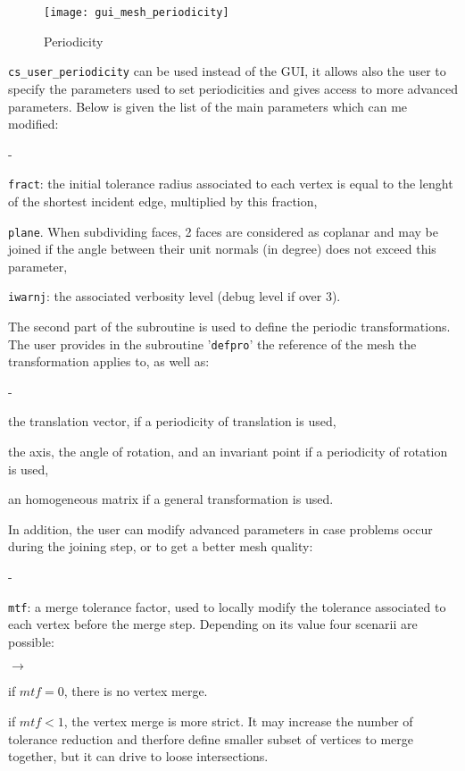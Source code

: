 {{{\begin{figure}[!h]
\begin{center}
\texttt{[image: gui\_mesh\_periodicity]}
\caption{Periodicity}
\label{fig:periodicities}
\end{center}
\end{figure}

\texttt{cs\_user\_periodicity} can be used instead of the GUI, it allows also the user to specify the parameters used to set periodicities and gives access to more advanced parameters. Below is given the list of the main parameters which can me modified:
\begin{list}{-}{}
\item \texttt{fract}: the initial tolerance radius associated to each vertex is equal to the lenght of the shortest incident edge, multiplied by this fraction,
\item \texttt{plane}. When subdividing faces, 2 faces are considered as coplanar and may be joined if the angle between their unit normals (in degree) does not exceed this parameter,
\item \texttt{iwarnj}: the associated verbosity level (debug level if over 3).
\end{list}
The second part of the subroutine is used to define the periodic transformations. The user provides in the subroutine '\texttt{defpro}' the reference of the mesh the transformation applies to, as well as:
\begin{list}{-}{}
\item the translation vector, if a periodicity of translation is used,
\item the axis, the angle of rotation, and an invariant point if a periodicity of rotation is used,
\item an homogeneous matrix if a general transformation is used.
\end{list}
In addition, the user can modify advanced parameters in case problems occur during the joining step, or to get a better mesh quality:
\begin{list}{-}{}
\item \texttt{mtf}: a merge tolerance factor, used to locally modify the tolerance associated to each vertex before the merge step. Depending on its value four scenarii are possible:
\begin{list}{$\rightarrow$}{}
\item if $mtf=0$, there is no vertex merge.
\item if $mtf<1$, the vertex merge is more strict. It may increase the number of tolerance reduction and therfore define smaller subset of vertices to merge together, but it can drive to loose intersections.

\end{list}
\end{list}}}}
